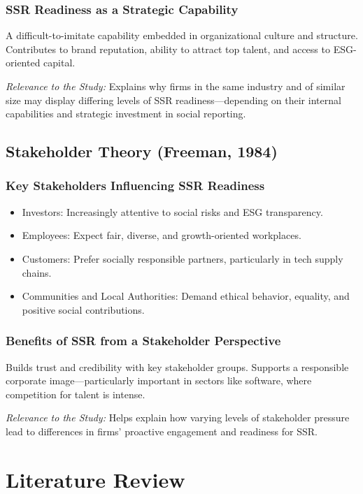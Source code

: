 \subsubsection{SSR Readiness as a Strategic Capability}
A difficult-to-imitate capability embedded in organizational culture and structure. Contributes to brand reputation, ability to attract top talent, and access to ESG-oriented capital.

\textit{Relevance to the Study:} Explains why firms in the same industry and of similar size may display differing levels of SSR readiness—depending on their internal capabilities and strategic investment in social reporting.

\subsection{Stakeholder Theory (Freeman, 1984)}
\subsubsection{Key Stakeholders Influencing SSR Readiness}
\begin{itemize}
    \item Investors: Increasingly attentive to social risks and ESG transparency.
    \item Employees: Expect fair, diverse, and growth-oriented workplaces.
    \item Customers: Prefer socially responsible partners, particularly in tech supply chains.
    \item Communities and Local Authorities: Demand ethical behavior, equality, and positive social contributions.
\end{itemize}

\subsubsection{Benefits of SSR from a Stakeholder Perspective}
Builds trust and credibility with key stakeholder groups. Supports a responsible corporate image—particularly important in sectors like software, where competition for talent is intense.

\textit{Relevance to the Study:} Helps explain how varying levels of stakeholder pressure lead to differences in firms' proactive engagement and readiness for SSR.

\section{Literature Review}

